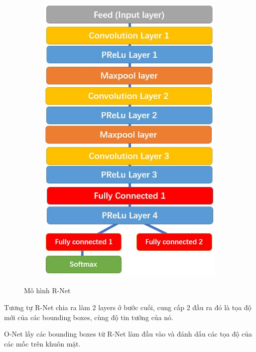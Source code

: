 \begin{figure}
    \begin{subfigure}{1.\textwidth}
        \begin{center}
            \includegraphics[width=0.6\linewidth]{Chapters/items/chap2_11.jpg}
        \end{center}
        \label{fig: chap2_11}
    \end{subfigure}
    \caption{Mô hình R-Net}
\end{figure}

\newpage
Tương tự R-Net chia ra làm 2 layers ở bước cuối, cung cấp 2 đầu ra đó là tọa độ
mới của các bounding boxes, cùng độ tin tưởng của nó.

O-Net lấy các bounding boxes từ R-Net làm đầu vào và đánh dấu các tọa độ của các mốc trên khuôn mặt.

